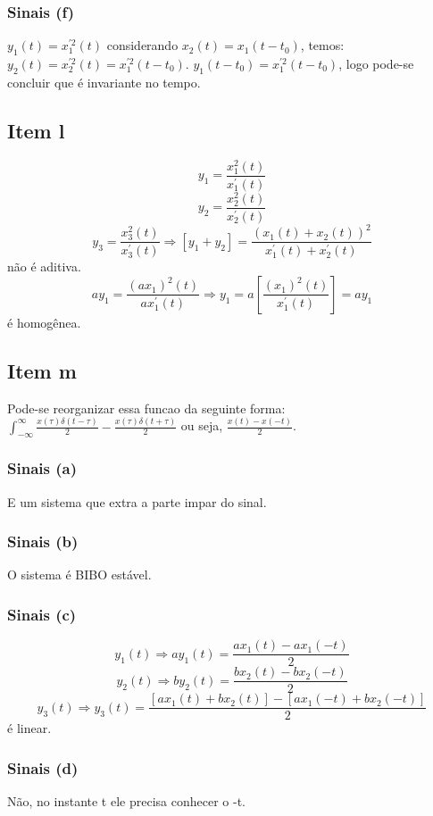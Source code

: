 \documentclass[a4paper, 12pt]{article}
\begin{document}
            \subsubsection{Sinais (f)}
            $y_{1}(t) = x_{1}^{'2}(t) $ considerando $x_{2}(t) = x_{1}(t-t_{0})$, temos: $y_{2}(t) = x_{2}^{'2}(t) = x_{1}^{'2}(t-t_{0})$. $y_{1}(t-t_{0}) = x_{1}^{'2}(t-t_{0})$, logo pode-se concluir que é invariante no tempo.
        \subsection{Item l}
        \[y_{1} = \frac{x^{2}_{1}(t)}{x_{1}^{'}(t)}\]
        \[y_{2} = \frac{x^{2}_{2}(t)}{x_{2}^{'}(t)}\]
        \[y_{3} = \frac{x^{2}_{3}(t)}{x_{3}^{'}(t)} \Rightarrow [y_{1} + y_{2}] = \frac{(x_{1}(t) + x_{2}(t))^{2} }{x_{1}^{'}(t) + x_{2}^{'}(t)}\] não é aditiva.
        \[ay_{1} = \frac{(ax_{1})^{2}(t)}{ax_{1}^{'}(t)} \Rightarrow y_{1} = a[\frac{(x_{1})^{2}(t)}{x_{1}^{'}(t)}] = ay_{1}\] é homogênea.

        \subsection{Item m}
            Pode-se reorganizar essa funcao da seguinte forma: $\int_{-\infty}^{\infty} \frac{x(\tau)\delta(t - \tau)}{2} - \frac{x(\tau)\delta(t + \tau)}{2}$ ou seja, $\frac{x(t) - x(-t)}{2}$.
            \subsubsection{Sinais (a)}
            E um sistema que extra a parte impar do sinal.
            \subsubsection{Sinais (b)}
            O sistema \'e BIBO est\'avel.
            \subsubsection{Sinais (c)}
            \[y_{1}(t) \Rightarrow  ay_{1}(t) = \frac{ax_{1}(t) - ax_{1}(-t)}{2}\]
            \[y_{2}(t) \Rightarrow  by_{2}(t) = \frac{bx_{2}(t) - bx_{2}(-t)}{2}\]
            \[y_{3}(t) \Rightarrow  y_{3}(t) = \frac{[ax_{1}(t) + bx_{2}(t)] - [ax_{1}(-t) + bx_{2}(-t)]}{2}\] \'e linear.
            \subsubsection{Sinais (d)}
            N\~ao, no instante t ele precisa conhecer o -t.
\end{document}
